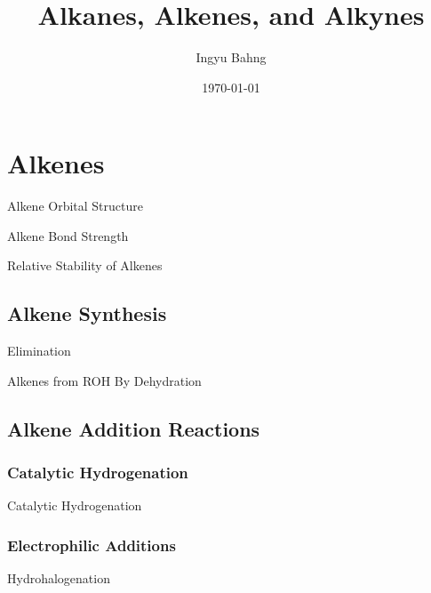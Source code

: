 \documentclass[10pt]{article}
\title{Alkanes, Alkenes, and Alkynes}
\date{\today}
\author{Ingyu Bahng}
\begin{document}


\section{Alkenes}

  \begin{core}{Alkene Orbital Structure}

  \end{core}

  \begin{core}{Alkene Bond Strength}

  \end{core}

  \begin{core}{Relative Stability of Alkenes}

  \end{core}

  \subsection{Alkene Synthesis}

    \begin{core}{Elimination}

    \end{core}

    \begin{core}{Alkenes from ROH By Dehydration}

    \end{core}

  \subsection{Alkene Addition Reactions}
    
    \subsubsection{Catalytic Hydrogenation}

      \begin{core}{Catalytic Hydrogenation}

      \end{core}

    \subsubsection{Electrophilic Additions}

      \begin{core}{Hydrohalogenation}

      \end{core}
\end{document}
